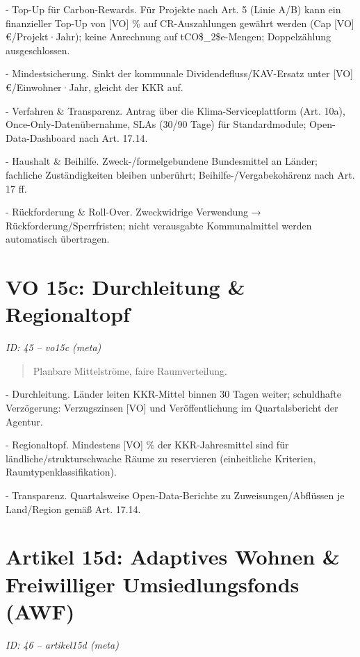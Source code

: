 \documentclass[12pt,a4paper]{scrartcl}
\begin{document}
- Top-Up für Carbon-Rewards. Für Projekte nach Art. 5 (Linie A/B) kann ein finanzieller Top-Up von [VO] \% auf CR-Auszahlungen gewährt werden (Cap [VO] €/Projekt·Jahr); keine Anrechnung auf tCO\$\_2\$e-Mengen; Doppelzählung ausgeschlossen.

- Mindestsicherung. Sinkt der kommunale Dividendefluss/KAV-Ersatz unter [VO] €/Einwohner·Jahr, gleicht der KKR auf.

- Verfahren \& Transparenz. Antrag über die Klima-Serviceplattform (Art. 10a), Once-Only-Datenübernahme, SLAs (30/90 Tage) für Standardmodule; Open-Data-Dashboard nach Art. 17.14.

- Haushalt \& Beihilfe. Zweck-/formelgebundene Bundesmittel an Länder; fachliche Zuständigkeiten bleiben unberührt; Beihilfe-/Vergabekohärenz nach Art. 17 ff.

- Rückforderung \& Roll-Over. Zweckwidrige Verwendung → Rückforderung/Sperrfristen; nicht verausgabte Kommunalmittel werden automatisch übertragen.


\section[VO 15c: Durchleitung \& Regionaltopf]{VO 15c: Durchleitung \& Regionaltopf}
\noindent\textit{ID: 45 -- vo15c (meta)}

\begin{quote}
Planbare Mittelströme, faire Raumverteilung.
\end{quote}

- Durchleitung. Länder leiten KKR-Mittel binnen 30 Tagen weiter; schuldhafte Verzögerung: Verzugszinsen [VO] und Veröffentlichung im Quartalsbericht der Agentur.

- Regionaltopf. Mindestens [VO] \% der KKR-Jahresmittel sind für ländliche/struktur­schwache Räume zu reservieren (einheitliche Kriterien, Raumtypenklassifikation).

- Transparenz. Quartalsweise Open-Data-Berichte zu Zuweisungen/Abflüssen je Land/Region gemäß Art. 17.14.


\section[Artikel 15d: Adaptives Wohnen \& Freiwilliger Umsiedlungsfonds (AWF)]{Artikel 15d: Adaptives Wohnen \& Freiwilliger Umsiedlungsfonds (AWF)}
\noindent\textit{ID: 46 -- artikel15d (meta)}
\end{document}
